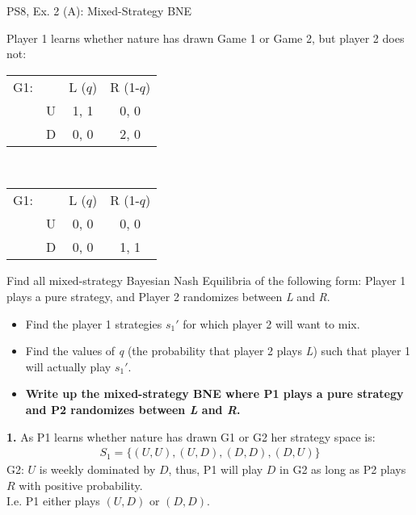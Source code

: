 \begin{frame}{PS8, Ex. 2 (A): Mixed-Strategy BNE}
    \begin{multicols}{2}
      Player 1 learns whether nature has drawn Game 1 or Game 2, but player 2 does not:
      \begin{table}
        \begin{tabular}{ll|c|c|}
          \multicolumn{1}{c}{G1:} & \multicolumn{1}{c}{} & \multicolumn{1}{c}{L ($q$)} & \multicolumn{1}{c}{R (1-$q$)} \\\cline{3-4}
          & U & 1, 1 & 0, 0 \\\cline{3-4}
          & D & 0, 0 & 2, 0 \\\cline{3-4}
        \end{tabular}\\\medskip
        \begin{tabular}{ll|c|c|}
          \multicolumn{1}{c}{G1:} & \multicolumn{1}{c}{} & \multicolumn{1}{c}{L ($q$)} & \multicolumn{1}{c}{R (1-$q$)} \\\cline{3-4}
          & U & 0, 0 & 0, 0 \\\cline{3-4}
          & D & 0, 0 & 1, 1 \\\cline{3-4}
        \end{tabular}
      \end{table}
      \vspace{-4pt}
      Find all mixed-strategy Bayesian Nash Equilibria of the following form: Player 1 plays a pure strategy, and Player 2 randomizes between \textit{L} and \textit{R}.
      \vspace{-4pt}
      \begin{itemize}
        \item[Step 1:] Find the player 1 strategies $s_1'$ for which player 2 will want to mix.
        \item[Step 2:] Find the values of \textit{q} (the probability that player 2 plays \textit{L}) such that player 1 will actually play $s_1'$.
        \item[Step 3:] \textbf{Write up the mixed-strategy BNE where P1 plays a pure strategy and P2 randomizes between \textit{L} and \textit{R}.}
      \end{itemize}
      \vfill\null\columnbreak
      \textbf{1.} As P1 learns whether nature has drawn G1 or G2 her strategy space is:
      \begin{align*}
        S_1=\{(U,U),(U,D),(D,D),(D,U)\}
      \end{align*}
      G2: $U$ is weekly dominated by $D$, thus, P1 will play $D$ in G2 as long as P2 plays $R$ with positive probability.\\\medskip I.e. P1 either plays $(U,D)$ or $(D,D)$.\\\medskip

\end{multicols}
\end{frame}
